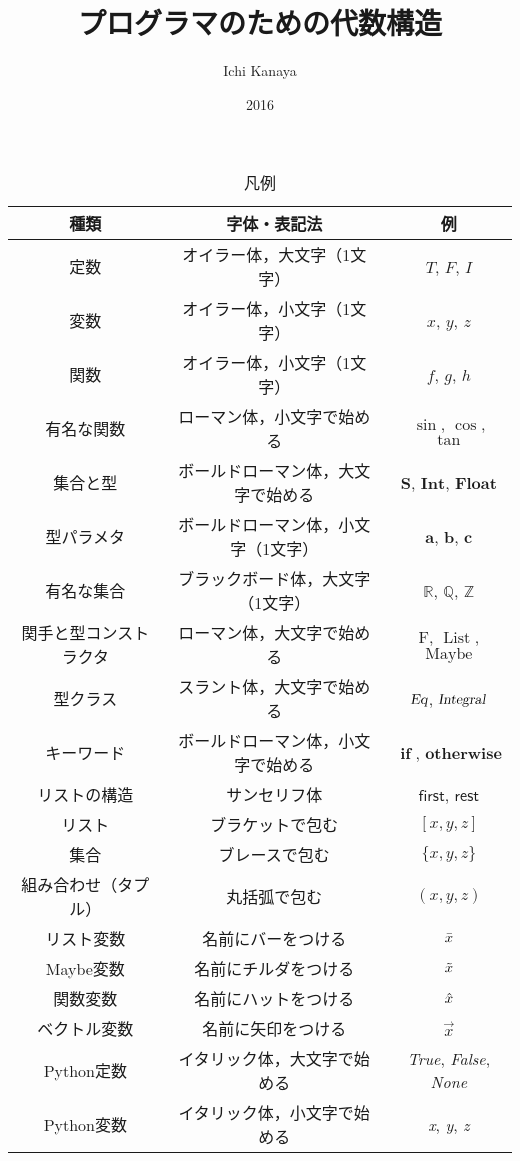 \documentclass[twocolumn]{jsbook}
\title{プログラマのための代数構造}
\author{Ichi Kanaya}
\date{2016}
\newcommand{\pthnId}[1]{\textit{#1}}
\newcommand{\hsklType}[1]{\textbf{#1}}
\newcommand{\hsklTypeclass}[1]{\textsl{#1}}
\newcommand{\hsklTypeConstructor}[1]{\mathop{\mathrm{#1}}}
\DeclareMathOperator{\hsklListConstructor}{\hsklTypeConstructor{List}}
\DeclareMathOperator{\hsklMaybeConstructor}{\hsklTypeConstructor{Maybe}}
\newcommand{\hsklInt}{\hsklType{Int}}
\newcommand{\hsklIntegral}{\hsklTypeclass{Integral}}
\newcommand{\hsklEq}{\hsklTypeclass{Eq}}
\newcommand{\hsklFloat}{\hsklType{Float}}
\newcommand{\hsklFunction}[1]{\Hat{#1}}
\newcommand{\hsklList}[1]{\Bar{#1}}
\newcommand{\hsklMaybe}[1]{\Tilde{#1}}
\newcommand{\mathKeyword}[1]{\mathbf{#1}}
\newcommand{\mathVarKeyword}[1]{\mathsf{#1}}
\DeclareMathOperator{\mathIf}{\mathKeyword{if}}
\newcommand{\mathFirst}{\mathVarKeyword{first}}
\newcommand{\mathOtherwise}{\mathKeyword{otherwise}}
\newcommand{\mathRest}{\mathVarKeyword{rest}}
\newcommand{\mathFunctor}[1]{\mathrm{#1}}
\newcommand{\mathSet}[1]{\mathbf{#1}}
\newcommand{\mathSpecialSet}[1]{\mathbb{#1}}
\newcommand{\mathVector}[1]{\vec{#1}}
\begin{document}
\maketitle
\tableofcontents

\begin{table*}
\caption{凡例}
\begin{center}
\begin{tabular}{||c|c|c||}
\hline
種類&字体・表記法&例\\
\hline
定数&オイラー体，大文字（1文字）&$T$, $F$, $I$\\
変数&オイラー体，小文字（1文字）&$x$, $y$, $z$\\
関数&オイラー体，小文字（1文字）&$f$, $g$, $h$\\
有名な関数&ローマン体，小文字で始める&$\sin$, $\cos$, $\tan$\\
集合と型&ボールドローマン体，大文字で始める&$\mathSet{S}$, $\hsklInt$, $\hsklFloat$\\
型パラメタ&ボールドローマン体，小文字（1文字）&$\hsklType{a}$, $\hsklType{b}$, $\hsklType{c}$\\
有名な集合&ブラックボード体，大文字（1文字）&$\mathSpecialSet{R}$, $\mathSpecialSet{Q}$, $\mathSpecialSet{Z}$\\
関手と型コンストラクタ&ローマン体，大文字で始める&$\mathFunctor{F}$, $\hsklListConstructor$, $\hsklMaybeConstructor$\\
型クラス&スラント体，大文字で始める&$\hsklEq$, $\hsklIntegral$\\
キーワード&ボールドローマン体，小文字で始める&$\mathIf$, $\mathOtherwise$\\
リストの構造&サンセリフ体&$\mathFirst$, $\mathRest$\\
\hline
リスト&ブラケットで包む&$[x,y,z]$\\
集合&ブレースで包む&$\{x,y,z\}$\\
組み合わせ（タプル）&丸括弧で包む&$(x,y,z)$\\
\hline
リスト変数&名前にバーをつける&$\hsklList{x}$\\
Maybe変数&名前にチルダをつける&$\hsklMaybe{x}$\\
関数変数&名前にハットをつける&$\hsklFunction{x}$\\
ベクトル変数&名前に矢印をつける&$\mathVector{x}$\\
\hline
Python定数&イタリック体，大文字で始める&\pthnId{True}, \pthnId{False}, \pthnId{None}\\
Python変数&イタリック体，小文字で始める&\pthnId{x}, \pthnId{y}, \pthnId{z}\\

\end{tabular}
\end{center}
\end{table*}
\end{document}
